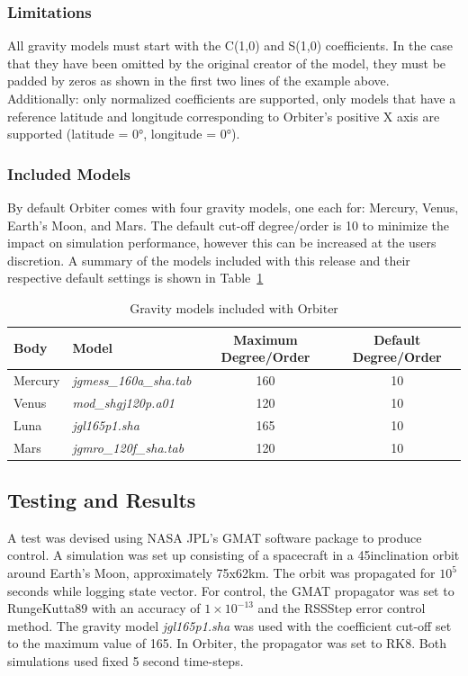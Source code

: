 \documentclass[a4paper]{article}
\begin{document}
\subsubsection{Limitations}
All gravity models must start with the C(1,0) and S(1,0) coefficients. In the case that they have been omitted by the original creator of the model, they must be padded by zeros as shown in the first two lines of the example above. Additionally: only normalized coefficients are supported, only models that have a reference latitude and longitude corresponding to Orbiter's positive X axis are supported (latitude = 0°, longitude = 0°).

\subsubsection{Included Models}
By default Orbiter comes with four gravity models, one each for: Mercury, Venus, Earth's Moon, and Mars. The default cut-off degree/order is 10 to minimize the impact on simulation performance, however this can be increased at the users discretion. A summary of the models included with this release and their respective default settings is shown in Table~\ref{tab:models}
\begin{table}[h]
\begin{tabular}{llcc}
Body    	& Model                 					& Maximum Degree/Order 		& Default Degree/Order \\\hline
Mercury 	& \emph{jgmess\_160a\_sha.tab} 		& 160                  			& 10                   \\
Venus   	& \emph{mod\_shgj120p.a01}     		& 120                  			& 10                   \\
Luna    	&\emph{ jgl165p1.sha}				& 165                  			& 10                   \\
Mars    	&\emph{ jgmro\_120f\_sha.tab}  		& 120                  			& 10                  
\end{tabular}
\caption{Gravity models included with Orbiter}
\label{tab:models}
\end{table}

\subsection{Testing and Results}
A test was devised using NASA JPL's GMAT software package to produce control. A simulation was set up consisting of a spacecraft in a 45\textdegree inclination orbit around Earth's Moon, approximately 75x62km. The orbit was propagated for $10^5$ seconds while logging state vector. For control, the GMAT propagator was set to RungeKutta89 with an accuracy of $1\times10^{-13}$ and the RSSStep error control method. The gravity model \emph{jgl165p1.sha} was used with the coefficient cut-off set to the maximum value of 165. In Orbiter, the propagator was set to RK8. Both simulations used fixed 5 second time-steps. 
\end{document}
